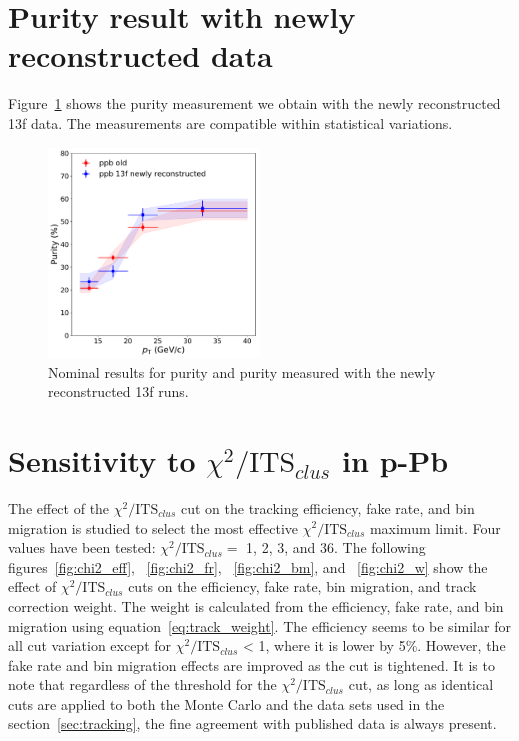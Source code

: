 \section{Purity result with newly reconstructed data}

Figure~\ref{newpurity} shows the purity measurement we obtain with the newly reconstructed 13f data. The measurements are compatible within statistical variations. 

\begin{figure}
\centering
\includegraphics[width=0.5\textwidth]{Purity/purities13ffinal.pdf}
\caption{Nominal results for purity and purity measured with the newly reconstructed 13f runs.}
\label{newpurity}
\end{figure}

\section{Sensitivity to $\chi^2/\mathrm{ITS}_{clus}$ in p-Pb}
The effect of the $\chi^2/\mathrm{ITS}_{clus}$ cut on the tracking efficiency, fake rate, and bin migration is studied to select the most effective $\chi^2/\mathrm{ITS}_{clus}$ maximum limit. Four values have been tested: $\chi^2/\mathrm{ITS}_{clus} =$ 1, 2, 3, and 36. The following figures~\ref{fig:chi2_eff}, ~\ref{fig:chi2_fr}, ~\ref{fig:chi2_bm}, and ~\ref{fig:chi2_w} show the effect of $\chi^2/\mathrm{ITS}_{clus}$ cuts on the efficiency, fake rate, bin migration, and track correction weight. The weight is calculated from the efficiency, fake rate, and bin migration using equation~\ref{eq:track_weight}. The efficiency seems to be similar for all cut variation except for $\chi^2/\mathrm{ITS}_{clus}$ < 1, where it is lower by 5\%. However, the fake rate and bin migration effects are improved as the cut is tightened. It is to note that regardless of the threshold for the $\chi^2/\mathrm{ITS}_{clus}$ cut, as long as identical cuts are applied to both the Monte Carlo and the data sets used in the section~\ref{sec:tracking}, the fine agreement with published data is always present.

